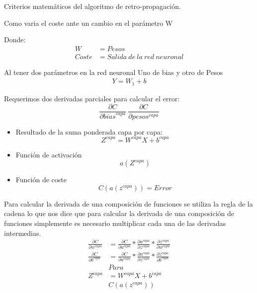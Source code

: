 Criterios matemáticos del algoritmo de retro-propagación.
\par Como varia el coste ante un cambio en el parámetro W 
\par Donde: 
\begin{align*}
    W & = Pesos \\
    Coste & = Salida\ de\ la\ red\ neuronal
\end{align*}
\par Al tener dos parámetros en la red neuronal Uno de bias y otro de Pesos
\begin{align*}
    Y = W_1 + b 
\end{align*}
\par Requerimos dos derivadas parciales para calcular el error:
\begin{equation*}
    \frac{\partial C}{\partial {bias}^{capa}} \ \frac{\partial C}{\partial
    {pesos}^{capa}}
\end{equation*}
\begin{itemize}
    \item  Resultado de la suma ponderada capa por capa:
        \begin{equation}
            Z^{capa} = W^{capa} X + b^{capa}
            \label{eq:redesneurales_sumaponderada}
        \end{equation}
    \item Función de activación
        \begin{equation*}
            a(Z^{capa})
        \end{equation*}
    \item Función de coste
        \begin{equation*}
            C(a(z^{capa})) = Error
        \end{equation*}
\end{itemize}
\par Para calcular la derivada de una composición de funciones se utiliza la
regla de la cadena lo que nos dice que para calcular la derivada de una
composición de funciones simplemente es necesario multiplicar cada una de las
derivadas intermedias.  
\begin{align*}
    \frac{\partial C}{\partial w^{capa}} &= \frac{\partial C}{\partial
        a^{capa}} * \frac{\partial a^{capa}}{\partial z^{capa}} * \frac{\partial
    z^{capa}}{\partial w^{capa}} \\ 
    \frac{\partial C}{\partial b^{capa}} &= \frac{\partial C}{\partial
        a^{capa}} * \frac{\partial a^{capa}}{\partial z^{capa}} *
        \frac{\partial z^{capa}}{\partial b^{capa}} \\ 
             & Para \\
    Z^{capa} &= W^{capa} X + b^{capa}\\ & C(a(z^{capa})) 
\end{align*}
